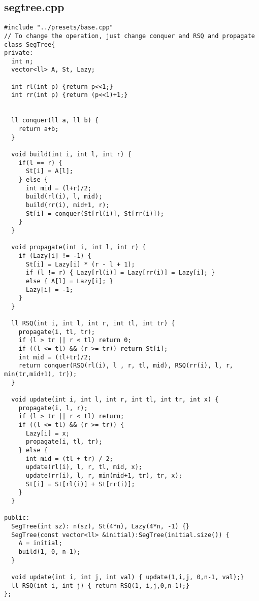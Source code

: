 \documentclass[11pt,landscape,twocolumn]{article}
\begin{document}
\subsection*{segtree.cpp}
\begin{lstlisting}
#include "../presets/base.cpp"
// To change the operation, just change conquer and RSQ and propagate
class SegTree{
private:
  int n;
  vector<ll> A, St, Lazy;

  int rl(int p) {return p<<1;}
  int rr(int p) {return (p<<1)+1;}

  
  ll conquer(ll a, ll b) {
    return a+b;
  }

  void build(int i, int l, int r) {
    if(l == r) {
      St[i] = A[l];
    } else {
      int mid = (l+r)/2;
      build(rl(i), l, mid);
      build(rr(i), mid+1, r);
      St[i] = conquer(St[rl(i)], St[rr(i)]);
    }
  }

  void propagate(int i, int l, int r) {
    if (Lazy[i] != -1) {
      St[i] = Lazy[i] * (r - l + 1);
      if (l != r) { Lazy[rl(i)] = Lazy[rr(i)] = Lazy[i]; }
      else { A[l] = Lazy[i]; }
      Lazy[i] = -1;
    }
  }

  ll RSQ(int i, int l, int r, int tl, int tr) {
    propagate(i, tl, tr);
    if (l > tr || r < tl) return 0;
    if ((l <= tl) && (r >= tr)) return St[i];
    int mid = (tl+tr)/2;
    return conquer(RSQ(rl(i), l , r, tl, mid), RSQ(rr(i), l, r, min(tr,mid+1), tr));
  }

  void update(int i, int l, int r, int tl, int tr, int x) {
    propagate(i, l, r);
    if (l > tr || r < tl) return;
    if ((l <= tl) && (r >= tr)) {
      Lazy[i] = x;
      propagate(i, tl, tr);
    } else {
      int mid = (tl + tr) / 2;
      update(rl(i), l, r, tl, mid, x);
      update(rr(i), l, r, min(mid+1, tr), tr, x);
      St[i] = St[rl(i)] + St[rr(i)];
    }
  }

public:
  SegTree(int sz): n(sz), St(4*n), Lazy(4*n, -1) {}
  SegTree(const vector<ll> &initial):SegTree(initial.size()) {
    A = initial;
    build(1, 0, n-1);
  }

  void update(int i, int j, int val) { update(1,i,j, 0,n-1, val);}
  ll RSQ(int i, int j) { return RSQ(1, i,j,0,n-1);}
};

\end{lstlisting}
\end{document}
